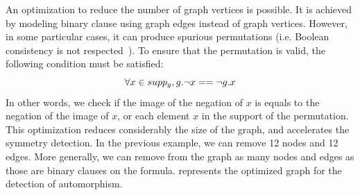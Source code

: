 %
%
%
An optimization to reduce the number of graph vertices is possible. It is achieved by modeling binary clause
using graph edges instead of graph vertices.  However, in some particular cases, it can produce
spurious permutations (i.e. Boolean consistency is not respected~\cite{aloul2003solving}).
To ensure that the permutation is valid, the following condition must be satisfied:
$$\forall x \in supp_g, g.\neg x == \neg g.x$$
In other words, we check if the image of the negation of $x$ is equals to the negation of the image of $x$,
or each element $x$ in the support of the permutation.
This optimization reduces considerably the size of the 
graph, and accelerates the symmetry detection.
In the previous example, we can remove 12 nodes and 12 edges. More generally,
we can remove from the graph as many nodes and edges as those are binary clauses on the formula.
 represents the optimized graph for the detection of automorphism.
